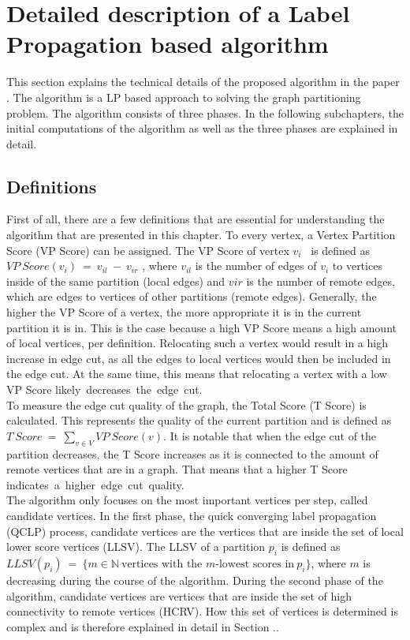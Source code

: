 \documentclass[acmsmall,nonacm,screen,review]{acmart}
\begin{document}
\section{Detailed description of a Label Propagation based algorithm}
This section explains the technical details of the proposed algorithm in the paper \cite{Main}. The algorithm is a LP based approach to solving the graph partitioning problem. The algorithm consists of three phases. In the following subchapters, the initial computations of the algorithm as well as the three phases are explained in detail.
\subsection{Definitions}
First of all, there are a few definitions that are essential for understanding the algorithm that are presented in this chapter. To every vertex, a Vertex Partition Score (VP Score) can be assigned. The VP Score of vertex $v_{i}$ \ is defined as $VP\ Score(v_{i})\ =\ v_{il}\ -\ v_{ir}$ , where $v_{il}$ is the number of edges of $v_{i}$ to vertices inside of the same partition (local edges) and $v{ir}$ is the number of remote edges, which are edges to vertices of other partitions (remote edges). Generally, the higher the VP Score of a vertex, the more appropriate it is in the current partition it is in. This is the case because a high VP Score means a high amount of local vertices, per definition. Relocating such a vertex would result in a high increase in edge cut, as all the edges to local vertices would then be included in the edge cut. At the same time, this means that relocating a vertex with a low VP Score \hbox{likely decreases the edge cut.} \\
To measure the edge cut quality of the graph, the Total Score (T Score) is calculated. This represents the quality of the current partition and is defined as $T\ Score\ =\ \sum_{v\in V} VP\ Score(v)$. It is notable that when the edge cut of the partition decreases, the T Score increases as it is connected to the amount of remote vertices that are in a graph. That means that a higher T Score \hbox{indicates a higher edge cut quality.} \\
The algorithm only focuses on the most important vertices per step, called candidate vertices. In the first phase, the quick converging label propagation (QCLP) process, candidate vertices are the vertices that are inside the set of local lower score vertices (LLSV). The LLSV of a partition $p_{i}$ is defined as $LLSV(p_{i})\ =\ \{ m\in \mathbb{N}\ \text{vertices with the }m\text{-lowest scores in}\ p_{i}\}$, where $m$ is decreasing during the course of the algorithm. During the second phase of the algorithm, candidate vertices are vertices that are inside the set of high connectivity to remote vertices (HCRV). How this set of vertices is determined is complex and is therefore explained in detail in Section ..
\end{document}
